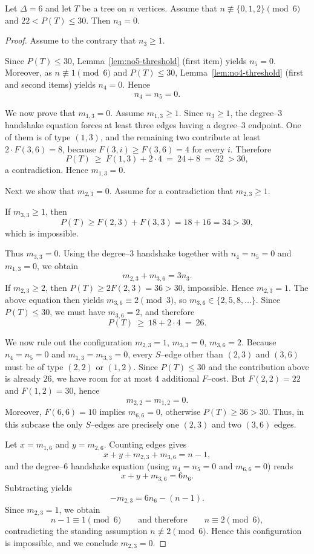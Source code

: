 \documentclass[preprint,12pt]{elsarticle}
\begin{document}
\begin{lemma}
\label{lem:no3-22-30}
Let $\Delta=6$ and let $T$ be a tree on $n$ vertices.
Assume that $n\not\equiv \{0,1,2\}\pmod 6$ and $22<P(T)\le 30$. 
Then $n_3=0$.
\end{lemma}

\begin{proof}
Assume to the contrary that $n_3\ge 1$.

Since $P(T)\le 30$, Lemma~\ref{lem:no5-threshold} (first item) yields $n_5=0$.
Moreover, as $n\not\equiv 1\pmod 6$ and $P(T)\le 30$,
Lemma~\ref{lem:no4-threshold} (first and second items) yields $n_4=0$.
Hence
\[
n_4=n_5=0.
\]

We now prove that $m_{1,3}=0$.
Assume $m_{1,3}\ge 1$.
Since $n_3\ge 1$, the degree--$3$ handshake equation forces at least three edges
having a degree--$3$ endpoint.
One of them is of type $(1,3)$, and the remaining two contribute at least
$2\cdot F(3,6)=8$, because $F(3,i)\ge F(3,6)=4$ for every $i$.
Therefore
\[
P(T)\ \ge\ F(1,3)+2\cdot 4\ =\ 24+8\ =\ 32\ >30,
\]
a contradiction. Hence $m_{1,3}=0$.

Next we show that $m_{2,3}=0$.
Assume for a contradiction that $m_{2,3}\ge 1$.

If $m_{3,3}\ge 1$, then
\[
P(T)\ge F(2,3)+F(3,3)=18+16=34>30,
\]
which is impossible.

Thus $m_{3,3}=0$.
Using the degree--$3$ handshake together with $n_4=n_5=0$ and $m_{1,3}=0$, we obtain
\[
m_{2,3}+m_{3,6}=3n_3.
\]
If $m_{2,3}\ge 2$, then $P(T)\ge 2F(2,3)=36>30$, impossible.
Hence $m_{2,3}=1$.
The above equation then yields $m_{3,6}\equiv 2\pmod 3$, so
$m_{3,6}\in\{2,5,8,\dots\}$.
Since $P(T)\le 30$, we must have $m_{3,6}=2$, and therefore
\[
P(T)\ \ge\ 18+2\cdot 4\ =\ 26.
\]

We now rule out the configuration
$m_{2,3}=1$, $m_{3,3}=0$, $m_{3,6}=2$.
Because $n_4=n_5=0$ and $m_{1,3}=m_{3,3}=0$, every $S$--edge other than $(2,3)$ and
$(3,6)$ must be of type $(2,2)$ or $(1,2)$.
Since $P(T)\le 30$ and the contribution above is already $26$, we have room for
at most $4$ additional $F$--cost.
But $F(2,2)=22$ and $F(1,2)=30$, hence
\[
m_{2,2}=m_{1,2}=0.
\]
Moreover, $F(6,6)=10$ implies $m_{6,6}=0$, otherwise $P(T)\ge 36>30$.
Thus, in this subcase the only $S$--edges are precisely one $(2,3)$ and two $(3,6)$ edges.

Let $x=m_{1,6}$ and $y=m_{2,6}$.
Counting edges gives
\[
x+y+m_{2,3}+m_{3,6}=n-1,
\]
and the degree--$6$ handshake equation (using $n_4=n_5=0$ and $m_{6,6}=0$) reads
\[
x+y+m_{3,6}=6n_6.
\]
Subtracting yields
\[
-m_{2,3}=6n_6-(n-1).
\]
Since $m_{2,3}=1$, we obtain
\[
n-1\equiv 1\pmod 6
\qquad\text{and therefore}\qquad
n\equiv 2\pmod 6,
\]
contradicting the standing assumption $n\not\equiv 2\pmod 6$.
Hence this configuration is impossible, and we conclude $m_{2,3}=0$.


\end{proof}
\end{document}
